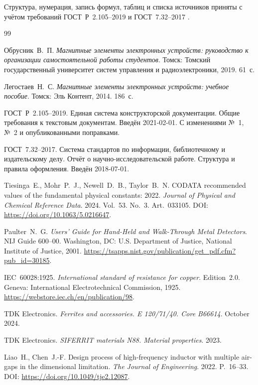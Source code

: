 \documentclass[14pt,a4paper]{extarticle}
\begin{document}
Структура, нумерация, запись формул, таблиц и списка источников приняты с
учётом требований ГОСТ~Р~2.105--2019 и ГОСТ~7.32--2017
\cite{gost2105,gost732}.

\begin{thebibliography}{99}

Обрусник~В.~П.
\textit{Магнитные элементы электронных устройств: руководство к
организации самостоятельной работы студентов}.
Томск: Томский государственный университет систем управления и
радиоэлектроники, 2019. 61~с.

Легостаев~Н.~С.
\textit{Магнитные элементы электронных устройств: учебное пособие}.
Томск: Эль Контент, 2014. 186~с.

ГОСТ~Р~2.105--2019. Единая система конструкторской документации.
Общие требования к текстовым документам. Введён 2021-02-01.
С изменениями №~1, №~2 и опубликованными поправками.

ГОСТ~7.32--2017. Система стандартов по информации, библиотечному и
издательскому делу. Отчёт о научно-исследовательской работе. Структура и
правила оформления. Введён 2018-07-01.

Tiesinga~E., Mohr~P.~J., Newell~D.~B., Taylor~B.~N.
CODATA recommended values of the fundamental physical constants: 2022.
\textit{Journal of Physical and Chemical Reference Data}. 2024. Vol.~53.
No.~3. Art.~033105.
DOI: \url{https://doi.org/10.1063/5.0216647}.

Paulter~N.~G.
\textit{Users' Guide for Hand-Held and Walk-Through Metal Detectors}.
NIJ Guide 600--00. Washington, DC: U.S. Department of Justice,
National Institute of Justice, 2001.
\url{https://tsapps.nist.gov/publication/get_pdf.cfm?pub_id=30185}.

IEC~60028:1925.
\textit{International standard of resistance for copper}. Edition~2.0.
Geneva: International Electrotechnical Commission, 1925.
\url{https://webstore.iec.ch/en/publication/98}.

TDK Electronics.
\textit{Ferrites and accessories. E 120/71/40. Core B66614}.
October 2024.

TDK Electronics.
\textit{SIFERRIT materials N88. Material properties}.
2023.

Liao~H., Chen~J.-F.
Design process of high-frequency inductor with multiple air-gaps in the
dimensional limitation.
\textit{The Journal of Engineering}. 2022. P.~16--33.
DOI: \url{https://doi.org/10.1049/tje2.12087}.


\end{thebibliography}
\end{document}
